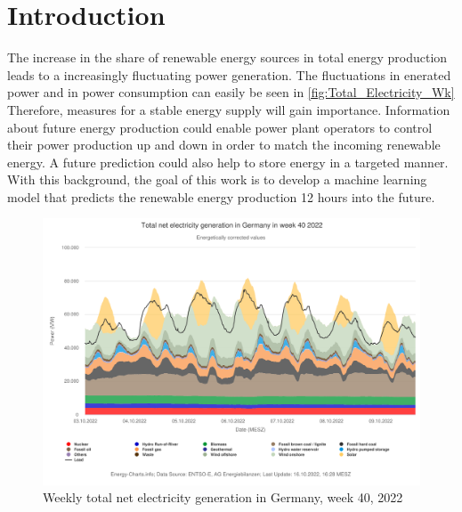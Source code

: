 \documentclass[11pt,table]{article}
\begin{document}
\newpage

\tableofcontents

\newpage


\section{Introduction}

The increase in the share of renewable energy sources in total energy production leads to a increasingly fluctuating power generation. The fluctuations in enerated power and in power consumption can easily be seen in \autoref{fig:Total_Electricity_Wk} Therefore, measures for a stable energy supply will gain importance. Information about future energy production could enable power plant operators to control their power production up and down in order to match the incoming renewable energy. A future prediction could also help to store energy in a targeted manner. 
With this background, the goal of this work is to develop a machine learning model that predicts the renewable energy production 12 hours into the future.\\

\begin{figure}[h!]
	\centering
	\includegraphics[scale=0.9]{Figures/Total_net_electricity_generation_in_Germany.pdf}
	\caption{Weekly total net electricity generation in Germany, week 40, 2022}
	\label{fig:Total_Electricity_Wk}
\end{figure}
\end{document}
